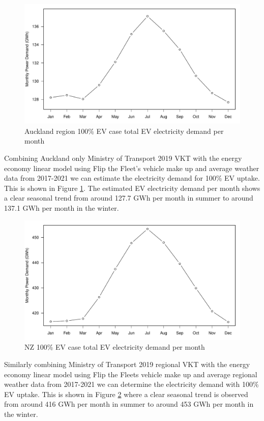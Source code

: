 \documentclass[
]{article}
\begin{document}
\begin{figure}
\centering
\includegraphics{final_report_files/figure-latex/Auckland_power-1.pdf}
\caption{Auckland region 100\% EV case total EV electricity demand per
month\label{fig:Auckland_power}}
\end{figure}

Combining Auckland only Ministry of Transport 2019 VKT with the energy
economy linear model using Flip the Fleet's vehicle make up and average
weather data from 2017-2021 we can estimate the electricity demand for
100\% EV uptake. This is shown in Figure \ref{fig:Auckland_power}. The
estimated EV electricity demand per month shows a clear seasonal trend
from around 127.7 GWh per month in summer to around 137.1 GWh per month
in the winter.

\begin{figure}
\centering
\includegraphics{final_report_files/figure-latex/NZ_power-1.pdf}
\caption{NZ 100\% EV case total EV electricity demand per
month\label{fig:NZ_power}}
\end{figure}

Similarly combining Ministry of Transport 2019 regional VKT with the
energy economy linear model using Flip the Fleets vehicle make up and
average regional weather data from 2017-2021 we can determine the
electricity demand with 100\% EV uptake. This is shown in Figure
\ref{fig:NZ_power} where a clear seasonal trend is observed from around
416 GWh per month in summer to around 453 GWh per month in the winter.
\end{document}
